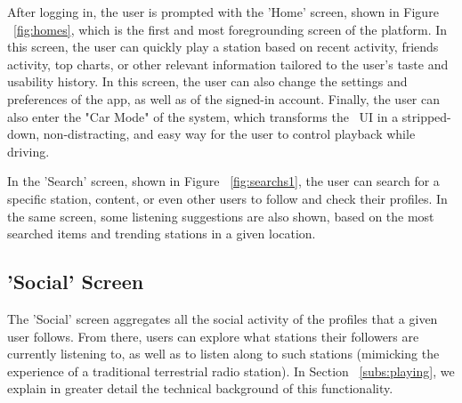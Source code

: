 After logging in, the user is prompted with the 'Home' screen, shown in Figure ~\ref{fig:homes}, which is the first and most foregrounding screen of the platform. In this screen, the user can quickly play a station based on recent activity, friends activity, top charts, or other relevant information tailored to the user's taste and usability history. In this screen, the user can also change the settings and preferences of the app, as well as of the signed-in account. Finally, the user can also enter the "Car Mode" of the system, which transforms the ~\ac{UI} in a stripped-down, non-distracting, and easy way for the user to control playback while driving.

In the 'Search' screen, shown in Figure ~\ref{fig:searchs1}, the user can search for a specific station, content, or even other users to follow and check their profiles. In the same screen, some listening suggestions are also shown, based on the most searched items and trending stations in a given location.

\newpage
\subsection{'Social' Screen}

The 'Social' screen aggregates all the social activity of the profiles that a given user follows. From there, users can explore what stations their followers are currently listening to, as well as to listen along to such stations (mimicking the experience of a traditional terrestrial radio station). In Section ~\ref{subs:playing}, we explain in greater detail the technical background of this functionality.

